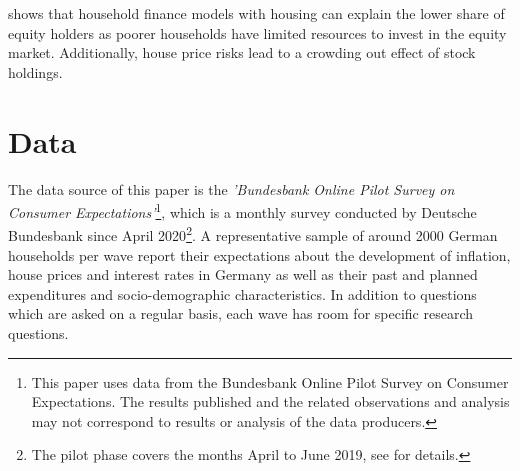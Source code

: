 \documentclass[ProjectABM]{subfiles}
\begin{document}
\cite{cocco2005housing} shows that household finance models with housing can explain the lower share of equity holders as poorer households have limited resources to invest in the equity market. Additionally, house price risks lead to a crowding out effect of stock holdings.







\section{Data}\label{sec:data}

The data source of this paper is the \textit{'Bundesbank Online Pilot Survey on Consumer Expectations'}\footnote{This paper uses data from the Bundesbank Online Pilot Survey on Consumer Expectations. The results published and the related observations and analysis may not correspond to results or analysis of the data producers.}, which is a monthly survey conducted by Deutsche Bundesbank since April 2020\footnote{The pilot phase covers the months April to June 2019, see \cite{bundesbank_2020} for details.}. A representative sample of around 2000 German households per wave report their expectations about the development of inflation, house prices and interest rates in Germany as well as their past and planned expenditures and socio-demographic characteristics. In addition to questions which are asked on a regular basis, each wave has room for specific research questions.
\end{document}
